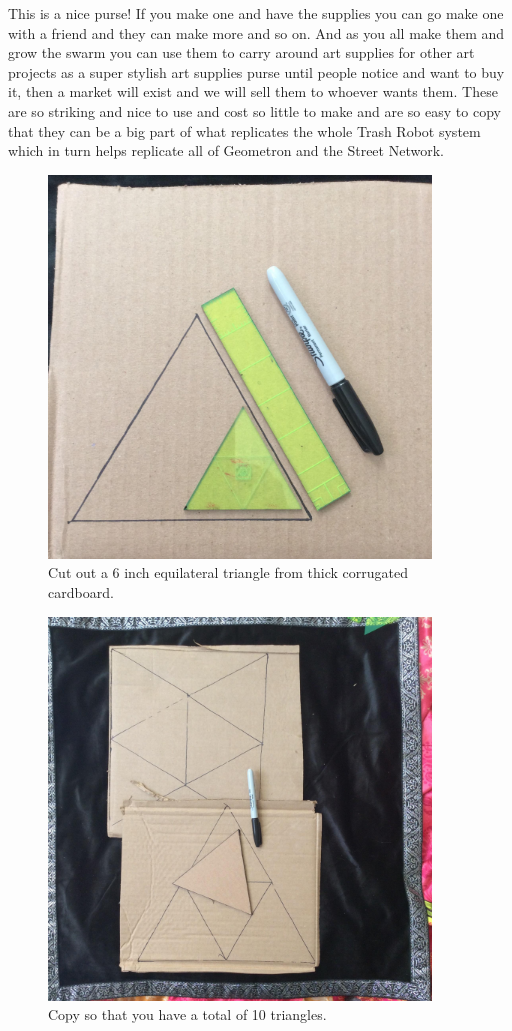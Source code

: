 This is a nice purse! If you make one and have the supplies you can go make one with a friend and they can make more and so on.  And as you all make them and grow the swarm you can use them to carry around art supplies for other art projects as a super stylish art supplies purse until people notice and want to buy it, then a market will exist and we will sell them to whoever wants them.  These are so striking and nice to use and cost so little to make and are so easy to copy that they can be a big part of what replicates the whole Trash Robot system which in turn helps replicate all of Geometron and the Street Network.


\begin{figure}
	\centering
	\includegraphics[width=4in]{figures/trashrobot/artboxtriangle.jpg}
	\caption[artboxtriangle]
	{Cut out a 6 inch equilateral triangle from thick corrugated cardboard.}
\end{figure}

\begin{figure}
	\centering
	\includegraphics[width=4in]{figures/trashrobot/artboxtriangleset.jpg}
	\caption[artboxtriangle]
	{Copy so that you have a total of 10 triangles.}
\end{figure}


